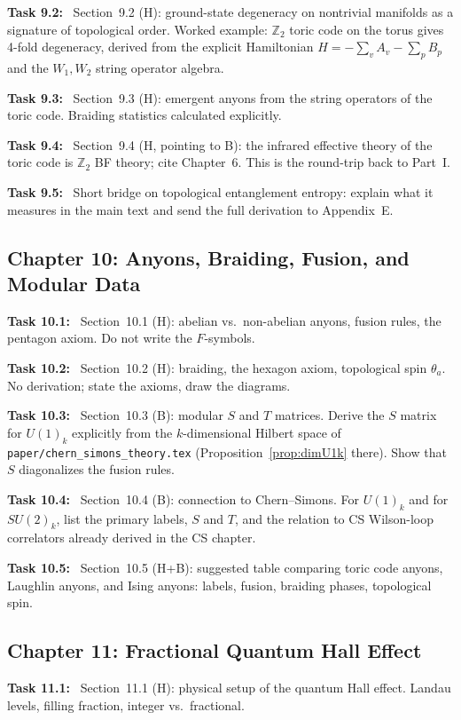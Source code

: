 \documentclass[11pt]{article}
\newcommand{\task}[1]{\medskip\noindent\textbf{Task #1:}\ }
\begin{document}
\task{9.2} Section~9.2 (H): ground-state degeneracy on nontrivial manifolds as a
signature of topological order. Worked example: $\mathbb{Z}_2$ toric code on the torus
gives 4-fold degeneracy, derived from the explicit Hamiltonian
$H = -\sum_v A_v - \sum_p B_p$ and the $W_1, W_2$ string operator algebra.

\task{9.3} Section~9.3 (H): emergent anyons from the string operators of the toric
code. Braiding statistics calculated explicitly.

\task{9.4} Section~9.4 (H, pointing to B): the infrared effective theory of the toric
code is $\mathbb{Z}_2$ BF theory; cite Chapter~6. This is the round-trip back to Part~I.

\task{9.5} Short bridge on topological entanglement entropy: explain what it measures in
the main text and send the full derivation to Appendix~E.

\subsection{Chapter 10: Anyons, Braiding, Fusion, and Modular Data}

\task{10.1} Section~10.1 (H): abelian vs.\ non-abelian anyons, fusion rules, the
pentagon axiom. Do not write the $F$-symbols.

\task{10.2} Section~10.2 (H): braiding, the hexagon axiom, topological spin $\theta_a$.
No derivation; state the axioms, draw the diagrams.

\task{10.3} Section~10.3 (B): modular $S$ and $T$ matrices. Derive the $S$ matrix for
$U(1)_k$ explicitly from the $k$-dimensional Hilbert space of
\texttt{paper/chern\_simons\_theory.tex} (Proposition~\ref{prop:dimU1k} there).
Show that $S$ diagonalizes the fusion rules.

\task{10.4} Section~10.4 (B): connection to Chern--Simons. For $U(1)_k$ and for
$SU(2)_k$, list the primary labels, $S$ and $T$, and the relation to CS Wilson-loop
correlators already derived in the CS chapter.

\task{10.5} Section~10.5 (H+B): suggested table comparing toric code anyons, Laughlin
anyons, and Ising anyons: labels, fusion, braiding phases, topological spin.

\subsection{Chapter 11: Fractional Quantum Hall Effect}

\task{11.1} Section~11.1 (H): physical setup of the quantum Hall effect. Landau levels,
filling fraction, integer vs.\ fractional.
\end{document}
